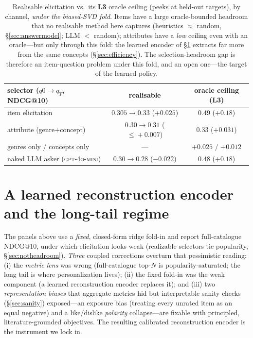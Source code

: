 \documentclass[11pt]{article}
\begin{document}
\begin{table}[h]\centering\small
\begin{tabular}{lcc}
\toprule
selector ($q0\!\to\!q_T$, NDCG@10) & realisable & oracle ceiling (L3)\\
\midrule
item elicitation & $0.305\to0.33$ ($+0.025$) & $\mathbf{0.49}$ ($\mathbf{+0.18}$)\\
attribute (genre$+$concept) & $0.30\to0.31$ ($\le\!+0.007$) & $0.33$ ($+0.031$)\\
\quad genres only / concepts only & --- & $+0.025$ / $+0.012$\\
naked LLM asker (\textsc{gpt-4o-mini}) & $0.30\to0.28$ ($-0.022$) & $0.48$ ($+0.18$)\\
\bottomrule
\end{tabular}
\caption{Realisable elicitation vs.\ its \textbf{L3} oracle ceiling (peeks at held-out targets), by channel,
\emph{under the biased-SVD fold}. Items have a
large oracle-bounded headroom that no realisable method here captures (heuristics $\approx$ random,
\S\ref{sec:answermodel}; LLM $<$ random); attributes have a \emph{low} ceiling even with an oracle---but only through
this fold: the learned encoder of \S\ref{sec:recon} extracts far more from the same concepts (\S\ref{sec:efficiency}).
The selection-headroom gap is therefore an item-question problem under this fold, and an open one---the target of the
learned policy.}
\label{tab:askers}
\end{table}

\section{A learned reconstruction encoder and the long-tail regime}\label{sec:recon}
The panels above use a \emph{fixed}, closed-form ridge fold-in and report full-catalogue NDCG@10, under which
elicitation looks weak (realizable selectors tie popularity, \S\ref{sec:notheadroom}). \emph{Three} coupled
corrections overturn that pessimistic reading: (i) the \emph{metric lens} was wrong (full-catalogue top-$N$ is
popularity-saturated; the long tail is where personalization lives); (ii) the fixed fold-in was the weak component
(a learned reconstruction encoder replaces it); and (iii) two \emph{representation biases} that aggregate metrics hid
but interpretable sanity checks (\S\ref{sec:sanity}) exposed---an exposure bias (treating every unrated item as an
equal negative) and a like/dislike \emph{polarity} collapse---are fixable with principled, literature-grounded
objectives. The resulting calibrated reconstruction encoder is the instrument we lock in.
\end{document}
